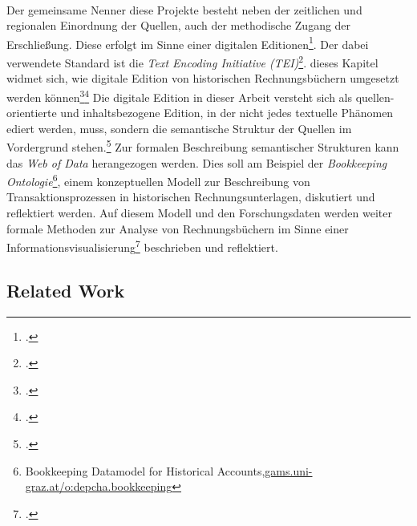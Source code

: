 \documentclass[12pt,a4paper]{article}
\begin{document}
\\
Der gemeinsame Nenner diese Projekte besteht neben der zeitlichen und regionalen Einordnung der Quellen, auch der methodische Zugang der Erschließung. Diese erfolgt im Sinne einer digitalen Editionen\footcite{sahle2013digitale}. Der dabei verwendete Standard ist die \textit{Text Encoding Initiative (TEI)}\footcite{cummings2013text}. dieses Kapitel widmet sich, wie digitale Edition von historischen Rechnungsbüchern umgesetzt werden können\footcite{tomasek2013encoding}\footcite{vogeler2016content} Die digitale Edition in dieser Arbeit versteht sich als quellen-orientierte und inhaltsbezogene Edition, in der nicht jedes textuelle Phänomen ediert werden, muss, sondern die semantische Struktur der Quellen im Vordergrund stehen.\footcite{vogeler2019assertive} Zur formalen Beschreibung semantischer Strukturen kann das \textit{Web of Data} herangezogen werden. Dies soll am Beispiel der \textit{Bookkeeping Ontologie}\footnote{Bookkeeping Datamodel for Historical Accounts,\url{gams.uni-graz.at/o:depcha.bookkeeping}}, einem konzeptuellen Modell zur Beschreibung von Transaktionsprozessen in historischen Rechnungsunterlagen, diskutiert und reflektiert werden. Auf diesem Modell und den Forschungsdaten werden weiter formale Methoden zur Analyse von Rechnungsbüchern im Sinne einer Informationsvisualisierung\footcite{frank2018visualisierungswerkzeuge} beschrieben und reflektiert.

\subsection{Related Work}
\end{document}

